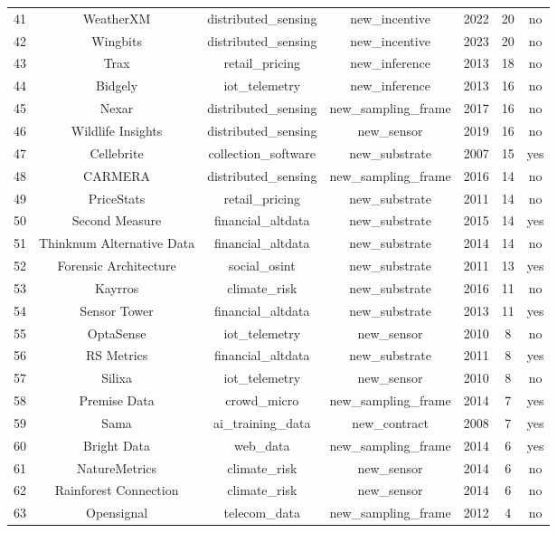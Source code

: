 \begin{table}[!htbp]
\begin{tabular}{@{\extracolsep{5pt}} ccccccc}
41 & WeatherXM & distributed\_sensing & new\_incentive & 2022 & 20 & no \\ 
42 & Wingbits & distributed\_sensing & new\_incentive & 2023 & 20 & no \\ 
43 & Trax & retail\_pricing & new\_inference & 2013 & 18 & no \\ 
44 & Bidgely & iot\_telemetry & new\_inference & 2013 & 16 & no \\ 
45 & Nexar & distributed\_sensing & new\_sampling\_frame & 2017 & 16 & no \\ 
46 & Wildlife Insights & distributed\_sensing & new\_sensor & 2019 & 16 & no \\ 
47 & Cellebrite & collection\_software & new\_substrate & 2007 & 15 & yes \\ 
48 & CARMERA & distributed\_sensing & new\_sampling\_frame & 2016 & 14 & no \\ 
49 & PriceStats & retail\_pricing & new\_substrate & 2011 & 14 & no \\ 
50 & Second Measure & financial\_altdata & new\_substrate & 2015 & 14 & yes \\ 
51 & Thinknum Alternative Data & financial\_altdata & new\_substrate & 2014 & 14 & no \\ 
52 & Forensic Architecture & social\_osint & new\_substrate & 2011 & 13 & yes \\ 
53 & Kayrros & climate\_risk & new\_substrate & 2016 & 11 & no \\ 
54 & Sensor Tower & financial\_altdata & new\_substrate & 2013 & 11 & yes \\ 
55 & OptaSense & iot\_telemetry & new\_sensor & 2010 &  8 & no \\ 
56 & RS Metrics & financial\_altdata & new\_substrate & 2011 &  8 & yes \\ 
57 & Silixa & iot\_telemetry & new\_sensor & 2010 &  8 & no \\ 
58 & Premise Data & crowd\_micro & new\_sampling\_frame & 2014 &  7 & yes \\ 
59 & Sama & ai\_training\_data & new\_contract & 2008 &  7 & yes \\ 
60 & Bright Data & web\_data & new\_sampling\_frame & 2014 &  6 & yes \\ 
61 & NatureMetrics & climate\_risk & new\_sensor & 2014 &  6 & no \\ 
62 & Rainforest Connection & climate\_risk & new\_sensor & 2014 &  6 & no \\ 
63 & Opensignal & telecom\_data & new\_sampling\_frame & 2012 &  4 & no \\ 

\end{tabular}
\end{table}

